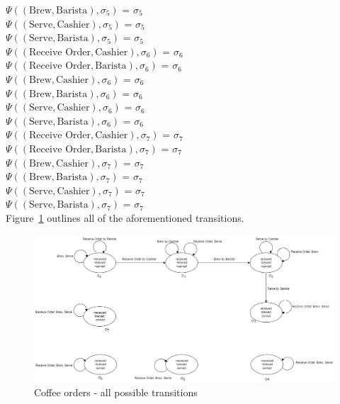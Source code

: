 \documentclass[a4paper]{article}
\begin{document}
$\Psi((\text{Brew},\text{Barista}),\sigma_5)$ = $\sigma_5$ \\[0.1\baselineskip] 
$\Psi((\text{Serve},\text{Cashier}),\sigma_5)$ = $\sigma_5$ \\[0.1\baselineskip] 
$\Psi((\text{Serve},\text{Barista}),\sigma_5)$ = $\sigma_5$ \\[0.7\baselineskip] 
$\Psi((\text{Receive Order},\text{Cashier}),\sigma_6)$ = $\sigma_6$ \\[0.1\baselineskip] 
$\Psi((\text{Receive Order},\text{Barista}),\sigma_6)$ = $\sigma_6$ \\[0.1\baselineskip] 
$\Psi((\text{Brew},\text{Cashier}),\sigma_6)$ = $\sigma_6$ \\[0.1\baselineskip] 
$\Psi((\text{Brew},\text{Barista}),\sigma_6)$ = $\sigma_6$ \\[0.1\baselineskip] 
$\Psi((\text{Serve},\text{Cashier}),\sigma_6)$ = $\sigma_6$ \\[0.1\baselineskip] 
$\Psi((\text{Serve},\text{Barista}),\sigma_6)$ = $\sigma_6$ \\[0.7\baselineskip] 
$\Psi((\text{Receive Order},\text{Cashier}),\sigma_7)$ = $\sigma_7$ \\[0.1\baselineskip] 
$\Psi((\text{Receive Order},\text{Barista}),\sigma_7)$ = $\sigma_7$ \\[0.1\baselineskip] 
$\Psi((\text{Brew},\text{Cashier}),\sigma_7)$ = $\sigma_7$ \\[0.1\baselineskip] 
$\Psi((\text{Brew},\text{Barista}),\sigma_7)$ = $\sigma_7$ \\[0.1\baselineskip] 
$\Psi((\text{Serve},\text{Cashier}),\sigma_7)$ = $\sigma_7$ \\[0.1\baselineskip] 
$\Psi((\text{Serve},\text{Barista}),\sigma_7)$ = $\sigma_7$ \\[0.7\baselineskip] 
Figure~\ref{fig:coffee_order_transactions} outlines all of the aforementioned transitions.
\begin{figure}[H]
    \centering
    \includegraphics[width=1\linewidth]{coffeshop.png}
    \caption{Coffee orders - all possible transitions}
    \label{fig:coffee_order_transactions}
\end{figure}
\end{document}
